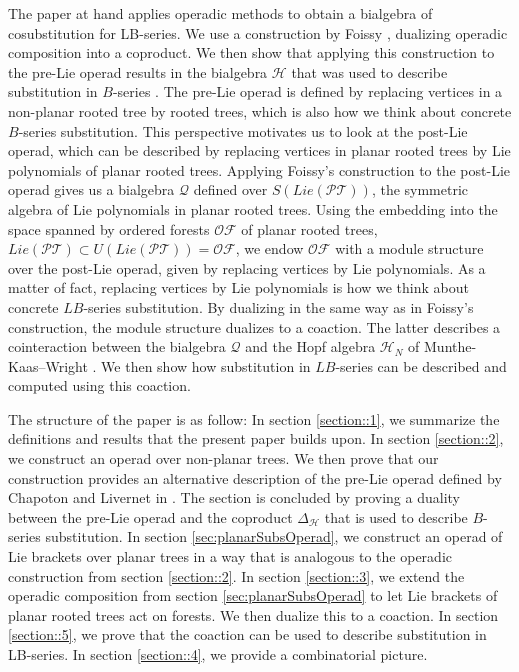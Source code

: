 \documentclass[10pt,a4paper]{article}
\begin{document}
The paper at hand applies operadic methods to obtain a bialgebra of cosubstitution for LB-series. We use a construction by Foissy \cite{Foissy2017}, dualizing operadic composition into a coproduct. We then show that applying this construction to the pre-Lie operad results in the bialgebra $\mathcal{H}$ that was used to describe substitution in $B$-series \cite{CalaqueEbrahimi-FardManchon2011}. The pre-Lie operad is defined by replacing vertices in a non-planar rooted tree by rooted trees, which is also how we think about concrete $B$-series substitution. This perspective motivates us to look at the post-Lie operad, which can be described by replacing vertices in planar rooted trees by Lie polynomials of planar rooted trees. Applying Foissy's construction to the post-Lie operad gives us a bialgebra $\mathcal{Q}$ defined over $S(Lie(\mathcal{PT}))$, the symmetric algebra of Lie polynomials in planar rooted trees. Using the embedding into the space spanned by ordered forests $\mathcal{OF}$ of planar rooted trees, $Lie(\mathcal{PT}) \subset U(Lie(\mathcal{PT}))=\mathcal{OF}$, we endow $\mathcal{OF}$ with a module structure over the post-Lie operad, given by replacing vertices by Lie polynomials. As a matter of fact, replacing vertices by Lie polynomials is how we think about concrete $LB$-series substitution. By dualizing in the same way as in Foissy's construction, the module structure dualizes to a coaction. The latter describes a cointeraction between the bialgebra $\mathcal{Q}$ and the Hopf algebra $\mathcal{H}_N$ of Munthe-Kaas--Wright \cite{LundervoldMunthe-Kaas2011}. We then show how substitution in $LB$-series can be described and computed using this coaction.

\medskip

The structure of the paper is as follow: In section \ref{section::1}, we summarize the definitions and results that the present paper builds upon. In section \ref{section::2}, we construct an operad over non-planar trees. We then prove that our construction provides an alternative description of the pre-Lie operad defined by Chapoton and Livernet in \cite{ChapotonLivernet2001}. The section is concluded by proving a duality between the pre-Lie operad and the coproduct $\Delta_{\mathcal{H}}$ that is used to describe $B$-series substitution. In section \ref{sec:planarSubsOperad}, we construct an operad of Lie brackets over planar trees in a way that is analogous to the operadic construction from section \ref{section::2}. In section \ref{section::3}, we extend the operadic composition from section \ref{sec:planarSubsOperad} to let Lie brackets of planar rooted trees act on forests. We then dualize this to a coaction. In section \ref{section::5}, we prove that the coaction can be used to describe substitution in LB-series. In section \ref{section::4}, we provide a combinatorial picture.
\end{document}
